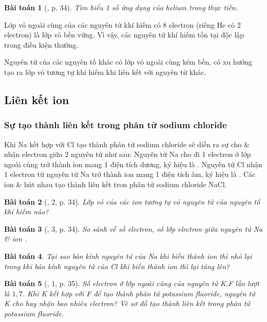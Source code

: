 \documentclass{article}
\newtheorem{baitoan}{Bài toán}
\begin{document}
\begin{baitoan}[\cite{SGK_KHTN_7_Canh_Dieu}, p. 34]
	Tìm hiểu 1 số ứng dụng của helium trong thực tiễn.
\end{baitoan}
Lớp vỏ ngoài cùng của các nguyên tử khí hiếm có 8 electron (riêng He có 2 electron) là lớp vỏ bền vững. Vì vậy, các nguyên tử khí hiếm tồn tại độc lập trong điều kiện thường.

Nguyên tử của các nguyên tố khác có lớp vỏ ngoài cùng kém bền, có xu hướng tạo ra lớp vỏ tương tự khí hiếm khi liên kết với nguyên tử khác.

\subsection{Liên kết ion}

\subsubsection{Sự tạo thành liên kết trong phân tử sodium chloride}
Khi Na kết hợp với Cl tạo thành phân tử sodium chloride sẽ diễn ra sự cho \& nhận electron giữa 2 nguyên tử như sau: Nguyên tử Na cho đi 1 electron ở lớp ngoài cùng trở thành ion mang 1 điện tích dương, ký hiệu là . Nguyên tử Cl nhận 1 electron từ nguyên tử Na trở thành ion mang 1 điện tích âm, ký hiệu là . Các ion  \&  hút nhau tạo thành liên kết tron phân tử sodium chloride NaCl.

\begin{baitoan}[\cite{SGK_KHTN_7_Canh_Dieu}, 2, p. 34]
	Lớp vỏ của các ion \emph{} tương tự vỏ nguyên tử của nguyên tố khí hiếm nào?
\end{baitoan}

\begin{baitoan}[\cite{SGK_KHTN_7_Canh_Dieu}, 3, p. 34]
	So sánh về số electron, số lớp electron giữa nguyên tử \emph{Na} \& ion \emph{}.
\end{baitoan}

\begin{baitoan}
	Tại sao bán kính nguyên tử của \emph{Na} khi biến thành ion \emph{} thì nhỏ lại trong khi bán kính nguyên tử của \emph{Cl} khi biến thành ion \emph{} thì lại tăng lên?
\end{baitoan}

\begin{baitoan}[\cite{SGK_KHTN_7_Canh_Dieu}, 1, p. 35]
	Số electron ở lớp ngoài cùng của nguyên tử \emph{K,F} lần lượt là $1,7$. Khi \emph{K} kết hợp với \emph{F} để tạo thành phân tử potassium fluoride, nguyên tử \emph{K} cho hay nhận bao nhiêu electron? Vẽ sơ đồ tạo thành liên kết trong phân tử potassium fluoride.
\end{baitoan}
\end{document}
